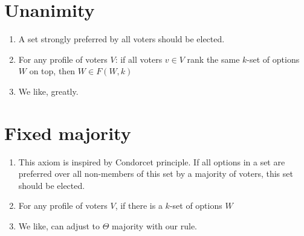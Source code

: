 \documentclass{article}
\begin{document}
\section{Unanimity}
\begin{enumerate}
\item A set strongly preferred by all voters should be elected.
\item For any profile of voters $V$: if all voters $v \in V$ rank the same $k$-set of options $W$ on top, then $W \in F(W, k)$
\item We like, greatly.
\end{enumerate}

\section{Fixed majority}
\begin{enumerate}
\item This axiom is inspired by Condorcet principle. If all options in a set are preferred over all non-members of this set by a majority of voters, this set should be elected.
\item For any profile of voters $V$, if there is a $k$-set of options $W$
\item We like, can adjust to $\Theta$ majority with our rule.
\end{enumerate}
\end{document}
